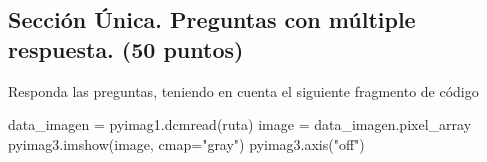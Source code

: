 \documentclass[12pt,a4paper]{article}
\newenvironment{Shaded}{\begin{snugshade}}{\end{snugshade}}
\newcommand{\NormalTok}[1]{\textcolor[rgb]{0.00,0.23,0.31}{#1}}
\newcommand{\OperatorTok}[1]{\textcolor[rgb]{0.37,0.37,0.37}{#1}}
\newcommand{\StringTok}[1]{\textcolor[rgb]{0.13,0.47,0.30}{#1}}
\begin{document}
\setcounter{page}{2} %
\subsection{Sección Única. Preguntas con múltiple respuesta. (50
puntos)}\label{secciuxf3n-uxfanica.-preguntas-con-muxfaltiple-respuesta.-50-puntos}

Responda las preguntas, teniendo en cuenta el siguiente fragmento de
código

\begin{Shaded}
\begin{Highlighting}[numbers=left,,]
\NormalTok{data\_imagen }\OperatorTok{=}\NormalTok{ pyimag1.dcmread(ruta)}
\NormalTok{image }\OperatorTok{=}\NormalTok{ data\_imagen.pixel\_array}
\NormalTok{pyimag3.imshow(image, cmap}\OperatorTok{=}\StringTok{"gray"}\NormalTok{)}
\NormalTok{pyimag3.axis(}\StringTok{"off"}\NormalTok{)}
\end{Highlighting}
\end{Shaded}
\end{document}
